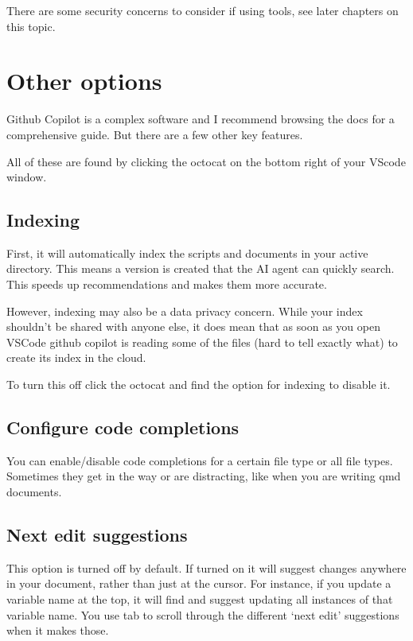 \documentclass[
  letterpaper,
  DIV=11,
  numbers=noendperiod]{scrreprt}
\begin{document}
There are some security concerns to consider if using tools, see later
chapters on this topic.

\section{Other options}\label{other-options}

Github Copilot is a complex software and I recommend browsing the docs
for a comprehensive guide. But there are a few other key features.

All of these are found by clicking the octocat on the bottom right of
your VScode window.

\subsection{Indexing}\label{indexing}

First, it will automatically index the scripts and documents in your
active directory. This means a version is created that the AI agent can
quickly search. This speeds up recommendations and makes them more
accurate.

However, indexing may also be a data privacy concern. While your index
shouldn't be shared with anyone else, it does mean that as soon as you
open VSCode github copilot is reading some of the files (hard to tell
exactly what) to create its index in the cloud.

To turn this off click the octocat and find the option for indexing to
disable it.

\subsection{Configure code
completions}\label{configure-code-completions}

You can enable/disable code completions for a certain file type or all
file types. Sometimes they get in the way or are distracting, like when
you are writing qmd documents.

\subsection{Next edit suggestions}\label{next-edit-suggestions}

This option is turned off by default. If turned on it will suggest
changes anywhere in your document, rather than just at the cursor. For
instance, if you update a variable name at the top, it will find and
suggest updating all instances of that variable name. You use tab to
scroll through the different `next edit' suggestions when it makes
those.
\end{document}

